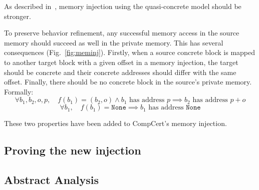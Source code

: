 As described in~\cite{DBLP:conf/pldi/KangHMGZV15}, memory injection using the quasi-concrete model should be stronger.

To preserve behavior refinement, any successful memory access in the source memory should succeed as well in the private memory. This has several consequences (Fig.~\ref{fig:meminj}).
Firstly, when a source concrete block is mapped to another target block with a given offset in a memory injection, the target should be concrete and their concrete addresses should differ with the same offset.
Finally, there should be no concrete block in the source's private memory.
Formally:
$$\forall b_1,b_2,o,p,\quad f(b_1)=(b_2,o)\wedge b_1\text{ has address }p\implies b_2\text{ has address }p+o$$
$$\forall b_1,\quad f(b_1)=\texttt{None}\implies b_1\text{ has address }\texttt{None}$$

These two properties have been added to CompCert's memory injection. 

\subsection{Proving the new injection}
\subsection{Abstract Analysis}
